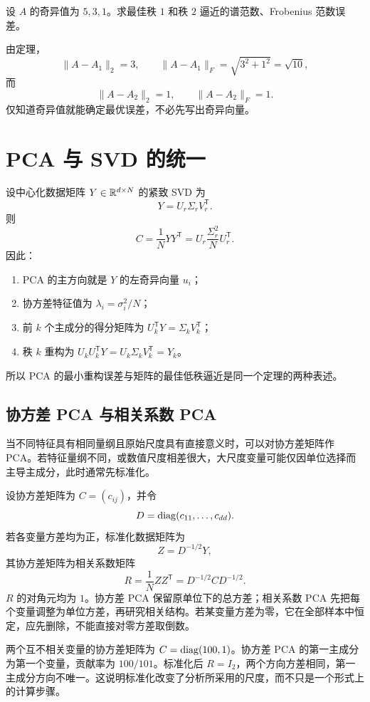 \begin{example}[title={截断 SVD 的误差}]
设 $A$ 的奇异值为 $5,3,1$。求最佳秩 $1$ 和秩 $2$ 逼近的谱范数、Frobenius 范数误差。
\begin{solution}
由定理，
\[
\lVert A-A_1\rVert_2=3,
\qquad
\lVert A-A_1\rVert_F=\sqrt{3^2+1^2}=\sqrt{10},
\]
而
\[
\lVert A-A_2\rVert_2=1,
\qquad
\lVert A-A_2\rVert_F=1.
\]
仅知道奇异值就能确定最优误差，不必先写出奇异向量。
\end{solution}
\end{example}

\section{PCA 与 SVD 的统一}

设中心化数据矩阵 $Y\in\mathbb{R}^{d\times N}$ 的紧致 SVD 为
\[
Y=U_r\Sigma_rV_r^{\mathsf T}.
\]
则
\[
C=\frac1NYY^{\mathsf T}
=U_r\frac{\Sigma_r^2}{N}U_r^{\mathsf T}.
\]
因此：
\begin{enumerate}
\item PCA 的主方向就是 $Y$ 的左奇异向量 $u_i$；
\item 协方差特征值为 $\lambda_i=\sigma_i^2/N$；
\item 前 $k$ 个主成分的得分矩阵为 $U_k^{\mathsf T}Y=\Sigma_kV_k^{\mathsf T}$；
\item 秩 $k$ 重构为 $U_kU_k^{\mathsf T}Y=U_k\Sigma_kV_k^{\mathsf T}=Y_k$。
\end{enumerate}
所以 PCA 的最小重构误差与矩阵的最佳低秩逼近是同一个定理的两种表述。

\subsection{协方差 PCA 与相关系数 PCA}

当不同特征具有相同量纲且原始尺度具有直接意义时，可以对协方差矩阵作 PCA。若特征量纲不同，或数值尺度相差很大，大尺度变量可能仅因单位选择而主导主成分，此时通常先标准化。

设协方差矩阵为 $C=(c_{ij})$，并令
\[
D=\operatorname{diag}(c_{11},\ldots,c_{dd}).
\]
若各变量方差均为正，标准化数据矩阵为
\[
Z=D^{-1/2}Y,
\]
其协方差矩阵为相关系数矩阵
\[
R=\frac1NZZ^{\mathsf T}=D^{-1/2}CD^{-1/2}.
\]
$R$ 的对角元均为 $1$。协方差 PCA 保留原单位下的总方差；相关系数 PCA 先把每个变量调整为单位方差，再研究相关结构。若某变量方差为零，它在全部样本中恒定，应先删除，不能直接对零方差取倒数。

\begin{example}[title={量纲对 PCA 的影响}]
两个互不相关变量的协方差矩阵为 $C=\operatorname{diag}(100,1)$。协方差 PCA 的第一主成分为第一个变量，贡献率为 $100/101$。标准化后 $R=I_2$，两个方向方差相同，第一主成分方向不唯一。这说明标准化改变了分析所采用的尺度，而不只是一个形式上的计算步骤。
\end{example}

